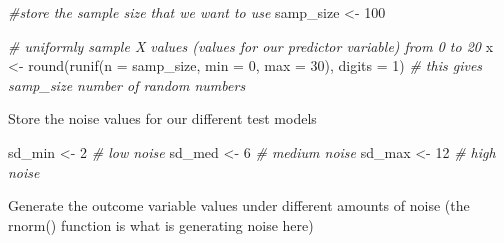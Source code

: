 \documentclass[
]{book}
\newenvironment{Shaded}{\begin{snugshade}}{\end{snugshade}}
\newcommand{\AttributeTok}[1]{\textcolor[rgb]{0.77,0.63,0.00}{#1}}
\newcommand{\CommentTok}[1]{\textcolor[rgb]{0.56,0.35,0.01}{\textit{#1}}}
\newcommand{\DecValTok}[1]{\textcolor[rgb]{0.00,0.00,0.81}{#1}}
\newcommand{\FunctionTok}[1]{\textcolor[rgb]{0.00,0.00,0.00}{#1}}
\newcommand{\NormalTok}[1]{#1}
\newcommand{\OtherTok}[1]{\textcolor[rgb]{0.56,0.35,0.01}{#1}}
\begin{document}
\begin{Shaded}
\begin{Highlighting}[]
\CommentTok{\#store the sample size that we want to use}
\NormalTok{samp\_size }\OtherTok{\textless{}{-}} \DecValTok{100}
\end{Highlighting}
\end{Shaded}

\begin{Shaded}
\begin{Highlighting}[]
\CommentTok{\# uniformly sample X values (values for our predictor variable) from 0 to 20 }
\NormalTok{x }\OtherTok{\textless{}{-}} \FunctionTok{round}\NormalTok{(}\FunctionTok{runif}\NormalTok{(}\AttributeTok{n =}\NormalTok{ samp\_size, }\AttributeTok{min =} \DecValTok{0}\NormalTok{, }\AttributeTok{max =} \DecValTok{30}\NormalTok{), }\AttributeTok{digits =} \DecValTok{1}\NormalTok{) }\CommentTok{\# this gives samp\_size number of random numbers}
\end{Highlighting}
\end{Shaded}

Store the noise values for our different test models

\begin{Shaded}
\begin{Highlighting}[]
\NormalTok{sd\_min }\OtherTok{\textless{}{-}} \DecValTok{2} \CommentTok{\# low noise}
\NormalTok{sd\_med }\OtherTok{\textless{}{-}} \DecValTok{6} \CommentTok{\# medium noise}
\NormalTok{sd\_max }\OtherTok{\textless{}{-}} \DecValTok{12} \CommentTok{\# high noise}
\end{Highlighting}
\end{Shaded}

Generate the outcome variable values under different amounts of noise (the rnorm() function is what is generating noise here)
\end{document}
